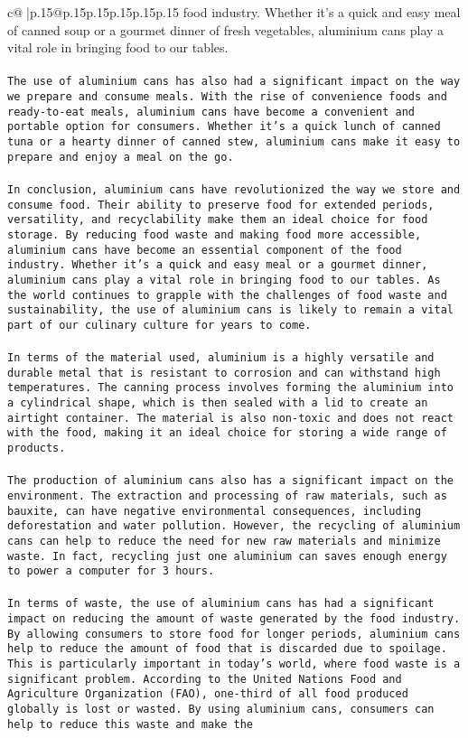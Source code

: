 \documentclass{article}
\begin{document}
{\begin{supertabular}{c@{$\;$}|p{.15\linewidth}@{}p{.15\linewidth}p{.15\linewidth}p{.15\linewidth}p{.15\linewidth}p{.15\linewidth}}
{{{food industry. Whether it's a quick and easy meal of canned soup or a gourmet dinner of fresh vegetables, aluminium cans play a vital role in bringing food to our tables.\\ \tt \\ \tt The use of aluminium cans has also had a significant impact on the way we prepare and consume meals. With the rise of convenience foods and ready-to-eat meals, aluminium cans have become a convenient and portable option for consumers. Whether it's a quick lunch of canned tuna or a hearty dinner of canned stew, aluminium cans make it easy to prepare and enjoy a meal on the go.\\ \tt \\ \tt In conclusion, aluminium cans have revolutionized the way we store and consume food. Their ability to preserve food for extended periods, versatility, and recyclability make them an ideal choice for food storage. By reducing food waste and making food more accessible, aluminium cans have become an essential component of the food industry. Whether it's a quick and easy meal or a gourmet dinner, aluminium cans play a vital role in bringing food to our tables. As the world continues to grapple with the challenges of food waste and sustainability, the use of aluminium cans is likely to remain a vital part of our culinary culture for years to come.\\ \tt \\ \tt In terms of the material used, aluminium is a highly versatile and durable metal that is resistant to corrosion and can withstand high temperatures. The canning process involves forming the aluminium into a cylindrical shape, which is then sealed with a lid to create an airtight container. The material is also non-toxic and does not react with the food, making it an ideal choice for storing a wide range of products.\\ \tt \\ \tt The production of aluminium cans also has a significant impact on the environment. The extraction and processing of raw materials, such as bauxite, can have negative environmental consequences, including deforestation and water pollution. However, the recycling of aluminium cans can help to reduce the need for new raw materials and minimize waste. In fact, recycling just one aluminium can saves enough energy to power a computer for 3 hours.\\ \tt \\ \tt In terms of waste, the use of aluminium cans has had a significant impact on reducing the amount of waste generated by the food industry. By allowing consumers to store food for longer periods, aluminium cans help to reduce the amount of food that is discarded due to spoilage. This is particularly important in today's world, where food waste is a significant problem. According to the United Nations Food and Agriculture Organization (FAO), one-third of all food produced globally is lost or wasted. By using aluminium cans, consumers can help to reduce this waste and make the }}}
\end{supertabular}}
\end{document}
